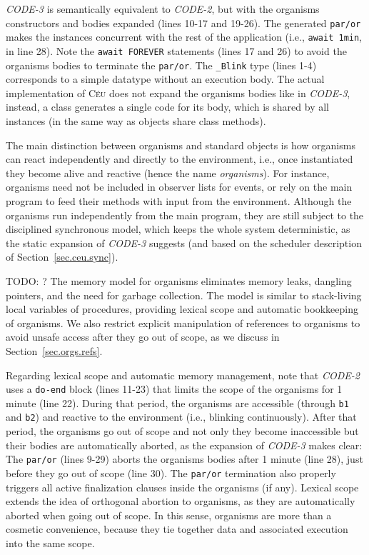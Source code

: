 \documentclass{acm_proc_article-sp}
\newcommand{\CEU}{\textsc{C\'{e}u}\xspace}
\newcommand{\code}[1] {{\small{\texttt{#1}}}}
\newcommand{\1}{\;}
\newcommand{\2}{\;\;}
\newcommand{\3}{\;\;\;}
\newcommand{\5}{\;\;\;\;\;}
\begin{document}
\emph{CODE-3} is semantically equivalent to \emph{CODE-2}, but with the 
organisms constructors and bodies expanded (lines 10-17 and 19-26).
The generated \code{par/or} makes the instances concurrent with the rest of the 
application (i.e., \code{await 1min}, in line 28).
Note the \code{await FOREVER} statements (lines 17 and 26) to avoid the 
organisms bodies to terminate the \code{par/or}.
The \code{\_Blink} type (lines 1-4) corresponds to a simple datatype without an
execution body.
%
The actual implementation of \CEU does not expand the organisms bodies like in 
\emph{CODE-3}, instead, a class generates a single code for its body, which is 
shared by all instances (in the same way as objects share class methods).

The main distinction between organisms and standard objects is how organisms 
can react independently and directly to the environment, i.e., once 
instantiated they become alive and reactive (hence the name \emph{organisms}).
%
For instance, organisms need not be included in observer lists for events, or 
rely on the main program to feed their methods with input from the environment.
%
Although the organisms run independently from the main program, they are still 
subject to the disciplined synchronous model, which keeps the whole system 
deterministic, as the static expansion of \emph{CODE-3} suggests (and based on 
the scheduler description of Section~\ref{sec.ceu.sync}).
%

TODO: ?
The memory model for organisms eliminates memory leaks, dangling pointers, and 
the need for garbage collection.
%
The model is similar to stack-living local variables of procedures, providing 
lexical scope and automatic bookkeeping of organisms.
We also restrict explicit manipulation of references to organisms to avoid 
unsafe access after they go out of scope, as we discuss in 
Section~\ref{sec.orgs.refs}.

Regarding lexical scope and automatic memory management, note that 
\emph{CODE-2} uses a \code{do-end} block (lines 11-23) that limits the scope of 
the organisms for 1 minute (line 22).
%
During that period, the organisms are accessible (through \code{b1} and 
\code{b2}) and reactive to the environment (i.e., blinking continuously).
%
After that period, the organisms go out of scope and not only they become 
inaccessible but their bodies are automatically aborted, as the expansion of 
\emph{CODE-3} makes clear:
%
The \code{par/or} (lines 9-29) aborts the organisms bodies after 1 minute (line 
28), just before they go out of scope (line 30).
%
The \code{par/or} termination also properly triggers all active finalization 
clauses inside the organisms (if any).
%
Lexical scope extends the idea of orthogonal abortion to organisms, as they are 
automatically aborted when going out of scope.
%
In this sense, organisms are more than a cosmetic convenience, because they tie 
together data and associated execution into the same scope.
\end{document}
